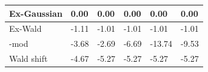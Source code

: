\begin{tabular}{|l|l|l|l|l|l|}
\hline
Ex-Gaussian&0.00&0.00&0.00&0.00&0.00\\\hline
Ex-Wald&-1.11&-1.01&-1.01&-1.01&-1.01\\\hline
\rocdd{}-mod&-3.68&-2.69&-6.69&-13.74&-9.53\\\hline
Wald shift&-4.67&-5.27&-5.27&-5.27&-5.27\\\hline
\end{tabular}
